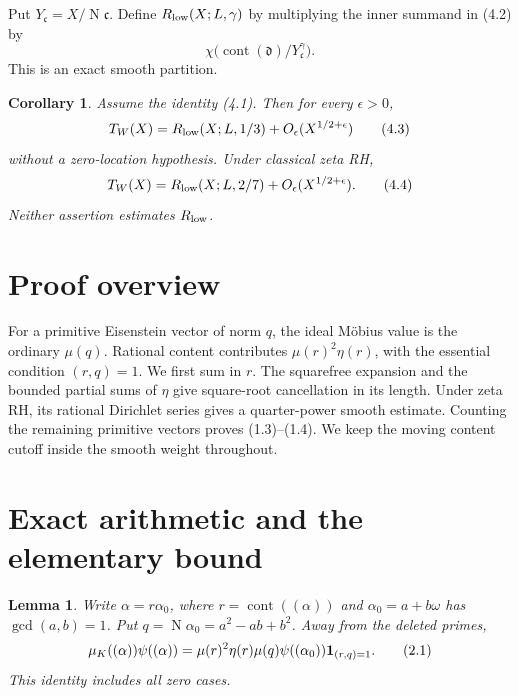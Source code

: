 \documentclass[11pt]{article}
\newtheorem{lemma}[theorem]{Lemma}
\newtheorem{corollary}[theorem]{Corollary}
\newcommand{\N}{\operatorname N}
\newcommand{\cont}{\operatorname{cont}}
\begin{document}
Put $Y_{\mathfrak c}=X/\N\mathfrak c$. Define
$R_{\rm low}(X;L,\gamma)$ by multiplying the inner summand
in (4.2) by
\[
                 \chi\bigl(\cont(\mathfrak d)/
                                  Y_{\mathfrak c}^{\gamma}\bigr).
\]
This is an exact smooth partition.

\begin{corollary}\label{cor:remainder}
Assume the identity (4.1). Then for every $\epsilon>0$,
\[
 T_W(X)=R_{\rm low}(X;L,1/3)+O_\epsilon(X^{1/2+\epsilon})
                                                        \tag{4.3}
\]
without a zero-location hypothesis. Under classical zeta RH,
\[
 T_W(X)=R_{\rm low}(X;L,2/7)+O_\epsilon(X^{1/2+\epsilon}).
                                                        \tag{4.4}
\]
Neither assertion estimates $R_{\rm low}$.
\end{corollary}

\section*{Proof overview}
For a primitive Eisenstein vector of norm $q$, the ideal M\"obius
value is the ordinary $\mu(q)$. Rational content contributes
$\mu(r)^2\eta(r)$, with the essential condition $(r,q)=1$.
We first sum in $r$. The squarefree expansion and the bounded
partial sums of $\eta$ give square-root cancellation in its
length. Under zeta RH, its rational Dirichlet series gives a
quarter-power smooth estimate. Counting the remaining primitive
vectors proves (1.3)--(1.4). We keep the moving content cutoff
inside the smooth weight throughout.

\section{Exact arithmetic and the elementary bound}

\begin{lemma}\label{lem:identity}
Write $\alpha=r\alpha_0$, where $r=\cont((\alpha))$ and
$\alpha_0=a+b\omega$ has $\gcd(a,b)=1$. Put
$q=\N\alpha_0=a^2-ab+b^2$. Away from the deleted primes,
\[
 \mu_K((\alpha))\psi((\alpha))
   =\mu(r)^2\eta(r)\mu(q)\psi((\alpha_0))
                      {\bf1}_{(r,q)=1}.                 \tag{2.1}
\]
This identity includes all zero cases.
\end{lemma}
\end{document}

